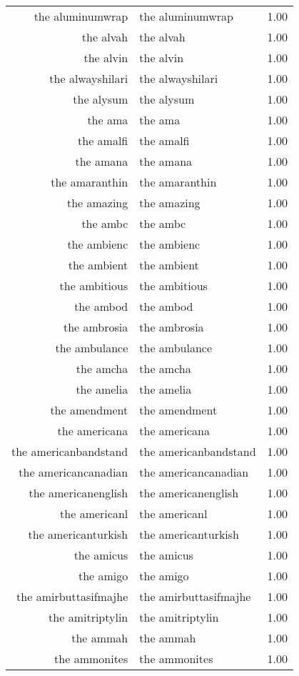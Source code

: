 \begin{table}[ht]
\begin{tabular}{rlr}
  the aluminumwrap & the aluminumwrap & 1.00 \\ 
  the alvah & the alvah & 1.00 \\ 
  the alvin & the alvin & 1.00 \\ 
  the alwayshilari & the alwayshilari & 1.00 \\ 
  the alysum & the alysum & 1.00 \\ 
  the ama & the ama & 1.00 \\ 
  the amalfi & the amalfi & 1.00 \\ 
  the amana & the amana & 1.00 \\ 
  the amaranthin & the amaranthin & 1.00 \\ 
  the amazing & the amazing & 1.00 \\ 
  the ambc & the ambc & 1.00 \\ 
  the ambienc & the ambienc & 1.00 \\ 
  the ambient & the ambient & 1.00 \\ 
  the ambitious & the ambitious & 1.00 \\ 
  the ambod & the ambod & 1.00 \\ 
  the ambrosia & the ambrosia & 1.00 \\ 
  the ambulance & the ambulance & 1.00 \\ 
  the amcha & the amcha & 1.00 \\ 
  the amelia & the amelia & 1.00 \\ 
  the amendment & the amendment & 1.00 \\ 
  the americana & the americana & 1.00 \\ 
  the americanbandstand & the americanbandstand & 1.00 \\ 
  the americancanadian & the americancanadian & 1.00 \\ 
  the americanenglish & the americanenglish & 1.00 \\ 
  the americanl & the americanl & 1.00 \\ 
  the americanturkish & the americanturkish & 1.00 \\ 
  the amicus & the amicus & 1.00 \\ 
  the amigo & the amigo & 1.00 \\ 
  the amirbuttasifmajhe & the amirbuttasifmajhe & 1.00 \\ 
  the amitriptylin & the amitriptylin & 1.00 \\ 
  the ammah & the ammah & 1.00 \\ 
  the ammonites & the ammonites & 1.00 \\ 

\end{tabular}
\end{table}
